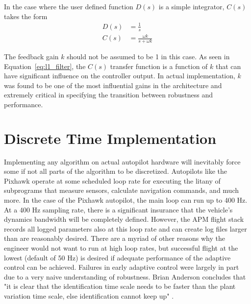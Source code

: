 In the case where the user defined function $D(s)$ is a simple integrator, $C(s)$ takes the form
\begin{equation}\label{eq:l1_filter}
\begin{split}
D(s)&=\frac{1}{s}\\
C(s)&=\frac{\omega k}{s+\omega k}
\end{split}
\end{equation}

The feedback gain $k$ should not be assumed to be 1 in this case.  As seen in Equation~\ref{eq:l1_filter}, the $C(s)$ transfer function is a function of $k$ that can have significant influence on the controller output.  In actual implementation, $k$ was found to be one of the most influential gains in the architecture and extremely critical in specifying the transition between robustness and performance.


\section{\Lone Discrete Time Implementation}\label{sec:discrete_time_implementation}
Implementing any algorithm on actual autopilot hardware will inevitably force some if not all parts of the algorithm to be discretized.  Autopilots like the Pixhawk operate at some scheduled loop rate for executing the litany of subprograms that measure sensors, calculate navigation commands, and much more.  In the case of the Pixhawk autopilot, the main loop can run up to 400 Hz.  At a 400 Hz sampling rate, there is a significant insurance that the vehicle's dynamics bandwidth will be completely defined.  However, the \ac{APM} flight stack records all logged parameters also at this loop rate and can create log files larger than are reasonably desired.  There are a myriad of other reasons why the engineer would not want to run at high loop rates, but successful flight at the lowest (default of 50 Hz) is desired if adequate performance of the adaptive control can be achieved.  Failures in early adaptive control were largely in part due to a very naive understanding of robustness.  Brian Anderson concludes that "it is clear that the identification time scale needs to be faster than the plant variation time scale, else identification cannot keep up" \cite{anderson2005failures}.  

